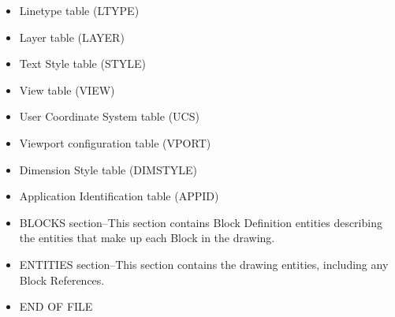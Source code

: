 \begin{itemize}
\item Linetype table (LTYPE)
\item Layer table (LAYER)
\item Text Style table (STYLE)
\item View table (VIEW)
\item User Coordinate System table (UCS)
\item Viewport configuration table (VPORT)
\item Dimension Style table (DIMSTYLE)
\item Application Identification table (APPID)
\item BLOCKS section–This section contains Block Definition entities describing the entities that make up each Block in the drawing.
\item ENTITIES section–This section contains the drawing entities, including any Block References.
\item END OF FILE
\end{itemize}

